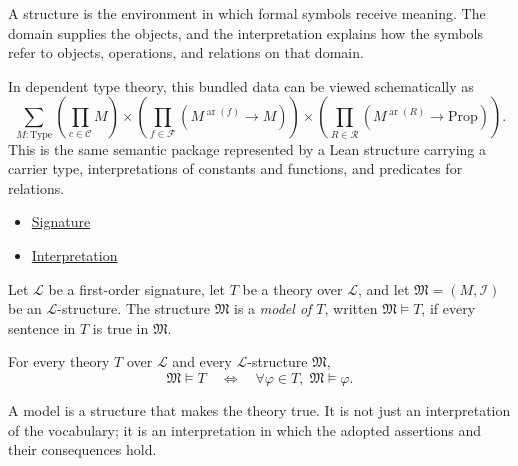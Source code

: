 \begin{remark*}[Interpretation]
A structure is the environment in which formal symbols receive meaning. The
domain supplies the objects, and the interpretation explains how the symbols
refer to objects, operations, and relations on that domain.
\end{remark*}

\begin{remark*}
In dependent type theory, this bundled data can be viewed schematically as
\[
\sum_{M:\mathrm{Type}}
\left(\prod_{c\in\mathcal{C}} M\right)
\times
\left(\prod_{f\in\mathcal{F}}(M^{\operatorname{ar}(f)}\to M)\right)
\times
\left(\prod_{R\in\mathcal{R}}(M^{\operatorname{ar}(R)}\to \mathrm{Prop})\right).
\]
This is the same semantic package represented by a Lean structure carrying a
carrier type, interpretations of constants and functions, and predicates for
relations.
\end{remark*}

\begin{dependencies}
\begin{itemize}
  \item \hyperref[def:signature]{Signature}
  \item \hyperref[def:axiom-systems-interpretation]{Interpretation}
\end{itemize}
\end{dependencies}

\begin{definition}[Model]
\label{def:axiom-systems-model}
Let $\mathcal{L}$ be a first-order signature, let $T$ be a theory over
$\mathcal{L}$, and let $\mathfrak{M}=(M,\mathcal{I})$ be an
$\mathcal{L}$-structure. The structure $\mathfrak{M}$ is a \emph{model of
$T$}, written $\mathfrak{M}\vDash T$, if every sentence in $T$ is true in
$\mathfrak{M}$.
\end{definition}

\begin{remark*}
For every theory $T$ over $\mathcal{L}$ and every $\mathcal{L}$-structure
$\mathfrak{M}$,
\[
  \mathfrak{M}\vDash T
  \quad\Longleftrightarrow\quad
  \forall \varphi\in T,\; \mathfrak{M}\vDash \varphi.
\]
\end{remark*}

\begin{remark*}[Interpretation]
A model is a structure that makes the theory true. It is not just an
interpretation of the vocabulary; it is an interpretation in which the adopted
assertions and their consequences hold.
\end{remark*}

